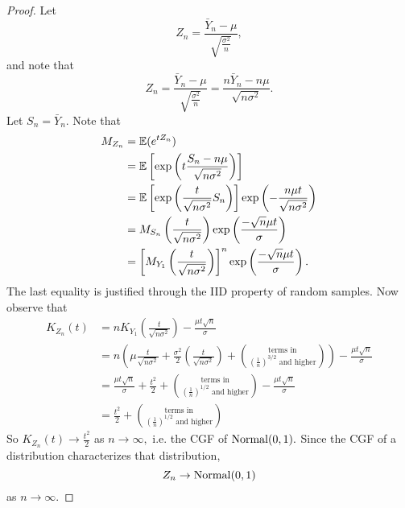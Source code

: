 \begin{proof}
    Let 
\[Z_n= \frac{\bar Y_n-\mu}{\sqrt{\frac{\sigma^2}{n}}},\]
	and note that
	$$Z_n=\frac{\bar{Y}_n-\mu}{\sqrt{\frac{\sigma^2}{n}}}=\frac{n\bar Y_n-n\mu}{\sqrt{n \sigma^2}}.$$
    Let $S_n=\bar{Y}_n$. Note that
    \begin{align*}
        M_{Z_n}&=\mathbb E(e^{tZ_n}) \\
        &=\mathbb E\left[\exp\left(t\frac{S_n -n\mu}{\sqrt{n\sigma^2}}\right)\right]\\
        &=\mathbb E\left[\exp\left(\frac{t}{\sqrt{n\sigma^2}}S_n\right)\right]\exp\left(-\frac{n\mu t}{\sqrt{n\sigma^2}}\right)\\
        &=M_{S_n}\left(\frac{t}{\sqrt{n\sigma^2}}\right)\exp\left(\frac{-\sqrt n \mu t}{\sigma}\right) \\
        &=\left[M_{Y_1}\left(\frac{t}{\sqrt{n\sigma^2}}\right)\right]^n
        \exp\left(\frac{-\sqrt n \mu t}{\sigma}\right).
    \end{align*}
    The last equality is justified through the IID property of random samples. Now observe that
    \begin{align*}
        K_{Z_n}(t)&=nK_{Y_1}\left(\frac{t}{\sqrt{n\sigma^2}}\right)-\frac{\mu t\sqrt n}{\sigma} \\
        &= n\left(\mu\frac{t}{\sqrt{n\sigma^2}}
        +\frac{\sigma^2}{2}\left(\frac{t}{\sqrt{n\sigma^2}}\right)+\binom{\text{terms in}}{\left(\frac{1}{n}\right)^{3/2}\text{ and higher}}\right) - \frac{\mu t\sqrt n}{\sigma} \\
        &=\frac{\mu t\sqrt n}{\sigma} + \frac{t^2}{2}+ \binom{\text{terms in}}{\left(\frac{1}{n}\right)^{1/2}\text{ and higher}}- \frac{\mu t\sqrt n}{\sigma} \\
		&=\frac{t^2}{2} + \binom{\text{terms in}}{\left(\frac{1}{n}\right)^{1/2}\text{ and higher}}
    \end{align*}
    So $K_{Z_n}(t)\to \frac{t^2}{2}$ as $n\to \infty,$ i.e. the CGF of $\operatorname*{Normal}(0,1).$ Since the CGF of a distribution characterizes that distribution,
    $$
    Z_n\to \operatorname*{Normal}(0,1)
    $$
	as $n\to \infty$.
    \end{proof}
